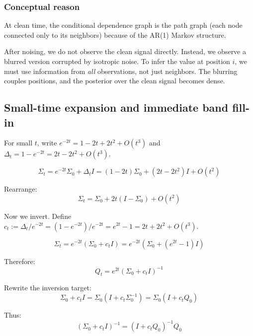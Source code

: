 \documentclass[11pt,a4paper]{article}
\theoremstyle{plain}
\theoremstyle{definition}
\newcommand{\Sig}{\Sigma}
\newcommand{\Prec}{Q}
\newcommand{\delt}{\Delta_t}
\begin{document}
\subsubsection{Conceptual reason}

At clean time, the conditional dependence graph is the path graph (each node connected only to its neighbors) because of the AR(1) Markov structure.

After noising, we do not observe the clean signal directly. Instead, we observe a blurred version corrupted by isotropic noise. To infer the value at position $i$, we must use information from \emph{all} observations, not just neighbors. The blurring couples positions, and the posterior over the clean signal becomes dense.

\subsection{Small-time expansion and immediate band fill-in}
\label{sec:small-time}

For small $t$, write $e^{-2t} = 1 - 2t + 2t^2 + O(t^3)$ and $\delt = 1 - e^{-2t} = 2t - 2t^2 + O(t^3)$.

\begin{equation}
\Sig_t = e^{-2t}\Sig_0 + \delt I = (1-2t)\Sig_0 + (2t - 2t^2)I + O(t^2)
\end{equation}

Rearrange:
\begin{equation}
\Sig_t = \Sig_0 + 2t(I - \Sig_0) + O(t^2)
\end{equation}

Now we invert. Define $c_t := \delt/e^{-2t} = (1-e^{-2t})/e^{-2t} = e^{2t} - 1 = 2t + 2t^2 + O(t^3)$.

\begin{equation}
\Sig_t = e^{-2t}(\Sig_0 + c_t I) = e^{-2t}(\Sig_0 + (e^{2t}-1)I)
\end{equation}

Therefore:
\begin{equation}
\Prec_t = e^{2t}(\Sig_0 + c_t I)^{-1}
\end{equation}

Rewrite the inversion target:
\begin{equation}
\Sig_0 + c_t I = \Sig_0(I + c_t \Sig_0^{-1}) = \Sig_0(I + c_t \Prec_0)
\end{equation}

Thus:
\begin{equation}
(\Sig_0 + c_t I)^{-1} = (I + c_t \Prec_0)^{-1} \Prec_0
\end{equation}
\end{document}
